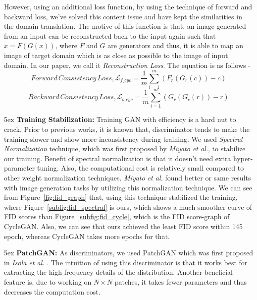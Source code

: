 \documentclass[conference]{IEEEtran}
\begin{document}
However, using an additional loss function, by using the technique of forward and backward loss\cite{DBLP:conf/icml/KimCKLK17, DBLP:conf/iccv/ZhuPIE17}, we've solved this content issue and have kept the similarities in the domain translation. The motive of this function is that, an image generated from an input can be reconstructed back to the input again such that $x = F(G(x))$, where $F$ and $G$ are generators and thus, it is able to map an image of target domain which is as close as possible to the image of input domain. In our paper, we call it \textit{Reconstruction Loss}. The equation is as follows - 
\begin{equation}
Forward\, Consistency\, Loss,\mathcal{L}_{f\_cyc} = \frac{1}{m} \sum^m_{i=1}(F_r(G_r(c)) - c)    
\end{equation}
\begin{equation}
Backward\, Consistency\, Loss,\mathcal{L}_{b\_cyc} = \frac{1}{m} \sum^m_{i=1}(G_r(G_c(r)) - r) 
\end{equation}

\parindent 5ex \textbf{Training Stabilization:}
Training GAN with efficiency is a hard nut to crack. Prior to previous works, it is known that, discriminator tends to make the training slower and show more inconsistency during training. We used \textit{Spectral Normalization} technique, which was first proposed by \textit{Miyato et al.}\cite{DBLP:journals/corr/abs-1802-05957}, to stabilize our training. Benefit of spectral normalization is that it doesn't need extra hyper-parameter tuning. Also, the computational cost is relatively small compared to other weight normalization techniques. \textit{Miyato et al.}\cite{DBLP:journals/corr/abs-1802-05957} found better or same results with image generation tasks by utilizing this normalization technique. We can see from Figure~\ref{fig:fid_graph}  that, using this technique stabilized the training, where Figure~\ref{subfig:fid_spectral} is ours, which shows a much smoother curve of FID scores than Figure~\ref{subfig:fid_cycle}, which is the FID score-graph of CycleGAN\cite{DBLP:conf/iccv/ZhuPIE17}. Also, we can see that ours achieved the least FID score within 145 epoch, whereas CycleGAN\cite{DBLP:conf/iccv/ZhuPIE17} takes more epochs for that.


\parindent 5ex \textbf{PatchGAN:}
As discriminators, we used PatchGAN which was first proposed in \textit{Isola et al.} \cite{DBLP:conf/cvpr/2017}. The intuition of using this discriminator is that it works best for extracting the high-frequency details of the distribution. Another beneficial feature is, due to working on $N\times N$ patches, it takes fewer parameters and thus decreases the computation cost.
\end{document}
